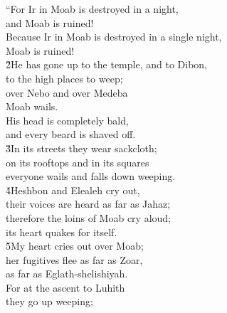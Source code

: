 \begin{poetry}
\poeml ``For Ir in Moab is destroyed in a night, \\
\poemll    and Moab is ruined! \\
\poeml Because Ir in Moab is destroyed in a single night, \\
\poemll    Moab is ruined! \\
\poeml \v{2}He has gone up to the temple, and to Dibon, \\
\poemll    to the high places to weep; \\
\poeml over Nebo and over Medeba \\
\poemll    Moab wails. \\
\poeml His head is completely bald, \\
\poemll    and every beard is shaved off. \\
\poeml \v{3}In its streets they wear sackcloth; \\
\poemll    on its rooftops and in its squares \\
\poemlll       everyone wails and falls down weeping. \\
\poeml \v{4}Heshbon and Elealeh cry out, \\
\poemll    their voices are heard as far as Jahaz; \\
\poeml therefore the loins of Moab cry aloud; \\
\poemll    its heart quakes for itself. \\
\poeml \v{5}My heart cries out over Moab; \\
\poemll    her fugitives flee as far as Zoar, \\
\poemlll       as far as Eglath-shelishiyah. \\
\poeml For at the ascent to Luhith \\
\poemll    they go up weeping; \\

\end{poetry}
